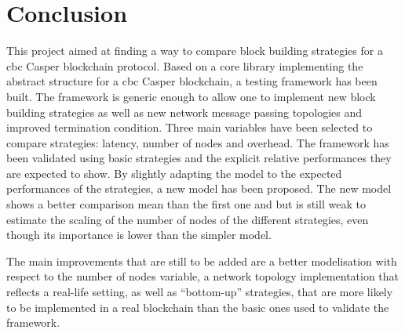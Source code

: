 \chapter{Conclusion}
\label{chap:conclusion}

This project aimed at finding a way to compare block building strategies for a
\gls{cbc} Casper blockchain protocol. Based on a core library implementing the
abstract structure for a \gls{cbc} Casper blockchain, a testing framework has
been built. The framework is generic enough to allow one to implement new block
building strategies as well as new network message passing topologies and
improved termination condition. Three main variables have been selected to
compare strategies: latency, number of nodes and overhead. The framework has
been validated using basic strategies and the explicit relative performances
they are expected to show. By slightly adapting the model to the expected
performances of the strategies, a new model has been proposed. The new model
shows a better comparison mean than the first one and but is still weak to
estimate the scaling of the number of nodes of the different strategies, even
though its importance is lower than the simpler model.

The main improvements that are still to be added are a better modelisation with
respect to the number of nodes variable, a network topology
implementation that reflects a real-life setting, as well as ``bottom-up''
strategies, that are more likely to be implemented in a real blockchain than the
basic ones used to validate the framework.
